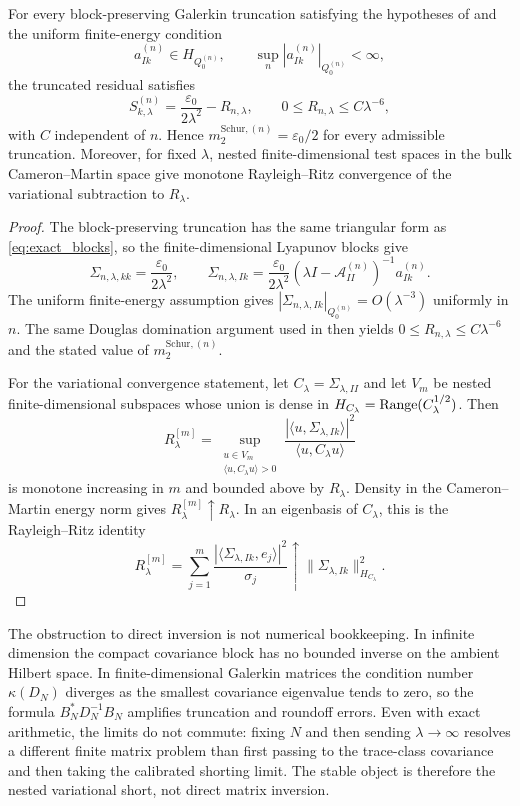 \begin{lemma}
\label{lem:galerkin_variational_shorting}
For every block-preserving Galerkin truncation satisfying the hypotheses of
 and the uniform finite-energy condition
\[
  a_{Ik}^{(n)}\in H_{Q_0^{(n)}},
  \qquad
  \sup_n |a_{Ik}^{(n)}|_{Q_0^{(n)}}<\infty,
\]
the truncated residual satisfies
\[
  S_{k,\lambda}^{(n)}
  =
  \frac{\varepsilon_0}{2\lambda^2}-R_{n,\lambda},
  \qquad
  0\le R_{n,\lambda}\le C\lambda^{-6},
\]
with $C$ independent of $n$.  Hence
$m_2^{\mathrm{Schur},(n)}=\varepsilon_0/2$ for every admissible truncation.
Moreover, for fixed $\lambda$, nested finite-dimensional test spaces in the
bulk Cameron--Martin space give monotone Rayleigh--Ritz convergence of the
variational subtraction to $R_\lambda$.
\end{lemma}

\begin{proof}
The block-preserving truncation has the same triangular form as
\eqref{eq:exact_blocks}, so the finite-dimensional Lyapunov blocks give
\[
  \Sigma_{n,\lambda,kk}=\frac{\varepsilon_0}{2\lambda^2},
  \qquad
  \Sigma_{n,\lambda,Ik}
  =
  \frac{\varepsilon_0}{2\lambda^2}
  (\lambda I-\mathcal{A}_{II}^{(n)})^{-1}a_{Ik}^{(n)}.
\]
The uniform finite-energy assumption gives
$|\Sigma_{n,\lambda,Ik}|_{Q_0^{(n)}}=O(\lambda^{-3})$ uniformly in $n$.
The same Douglas domination argument used in
 then yields
$0\le R_{n,\lambda}\le C\lambda^{-6}$ and the stated value of
$m_2^{\mathrm{Schur},(n)}$.

For the variational convergence statement, let
$C_\lambda=\Sigma_{\lambda,II}$ and let $V_m$ be nested finite-dimensional
subspaces whose union is dense in $H_{C_\lambda}=\operatorname{Range}(C_\lambda^{1/2})$.
Then
\[
  R_\lambda^{[m]}
  =
  \sup_{\substack{u\in V_m\\ \langle u,C_\lambda u\rangle>0}}
  \frac{|\langle u,\Sigma_{\lambda,Ik}\rangle|^2}
       {\langle u,C_\lambda u\rangle}
\]
is monotone increasing in $m$ and bounded above by $R_\lambda$.  Density in the
Cameron--Martin energy norm gives $R_\lambda^{[m]}\uparrow R_\lambda$.  In an
eigenbasis of $C_\lambda$, this is the Rayleigh--Ritz identity
\[
  R_\lambda^{[m]}
  =
  \sum_{j=1}^m
  \frac{|\langle\Sigma_{\lambda,Ik},e_j\rangle|^2}{\sigma_j}
  \uparrow
  \|\Sigma_{\lambda,Ik}\|_{H_{C_\lambda}}^2.
\]
\end{proof}

The obstruction to direct inversion is not numerical bookkeeping.  In infinite
dimension the compact covariance block has no bounded inverse on the ambient
Hilbert space.  In finite-dimensional Galerkin matrices the condition number
$\kappa(D_N)$ diverges as the smallest covariance eigenvalue tends to zero, so
the formula $B_N^*D_N^{-1}B_N$ amplifies truncation and roundoff errors.  Even
with exact arithmetic, the limits do not commute: fixing $N$ and then sending
$\lambda\to\infty$ resolves a different finite matrix problem than first
passing to the trace-class covariance and then taking the calibrated shorting
limit.  The stable object is therefore the nested variational short, not direct
matrix inversion.


